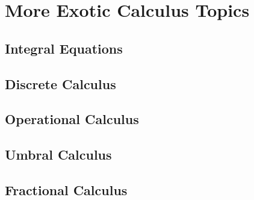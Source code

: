 \section{More Exotic Calculus Topics}

\subsection{Integral Equations}


\subsection{Discrete Calculus}



\subsection{Operational Calculus}

\subsection{Umbral Calculus}


\subsection{Fractional Calculus}


